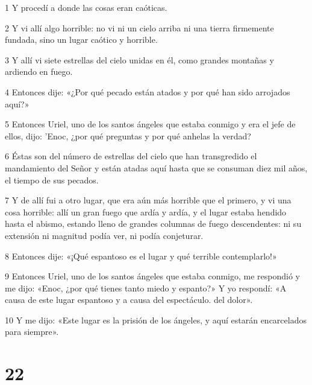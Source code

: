 \par 1 Y procedí a donde las cosas eran caóticas.
\par 2 Y vi allí algo horrible: no vi ni un cielo arriba ni una tierra firmemente fundada, sino un lugar caótico y horrible.
\par 3 Y allí vi siete estrellas del cielo unidas en él, como grandes montañas y ardiendo en fuego.
\par 4 Entonces dije: «¿Por qué pecado están atados y por qué han sido arrojados aquí?»
\par 5 Entonces Uriel, uno de los santos ángeles que estaba conmigo y era el jefe de ellos, dijo: 'Enoc, ¿por qué preguntas y por qué anhelas la verdad?
\par 6 Éstas son del número de estrellas del cielo que han transgredido el mandamiento del Señor y están atadas aquí hasta que se consuman diez mil años, el tiempo de sus pecados.
\par 7 Y de allí fui a otro lugar, que era aún más horrible que el primero, y vi una cosa horrible: allí un gran fuego que ardía y ardía, y el lugar estaba hendido hasta el abismo, estando lleno de grandes columnas de fuego descendentes: ni su extensión ni magnitud podía ver, ni podía conjeturar.
\par 8 Entonces dije: «¡Qué espantoso es el lugar y qué terrible contemplarlo!»
\par 9 Entonces Uriel, uno de los santos ángeles que estaba conmigo, me respondió y me dijo: «Enoc, ¿por qué tienes tanto miedo y espanto?» Y yo respondí: «A causa de este lugar espantoso y a causa del espectáculo. del dolor».
\par 10 Y me dijo: «Este lugar es la prisión de los ángeles, y aquí estarán encarcelados para siempre».

\chapter{22}

